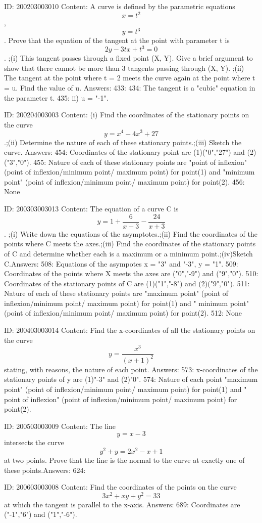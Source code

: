 \documentclass{article}
\begin{document}
ID: 200203003010
Content:
A curve is defined by the parametric equations  $$x = t^2 $$,  $$y = t^3 $$. Prove that the equation of the tangent at the point with parameter t is  $$2y - 3tx + t^3  = 0$$. ;(i) This tangent passes through a fixed point (X, Y). Give a brief argument to show that there cannot be more than 3 tangents passing through (X, Y). ;(ii) The tangent at the point where t = 2 meets the curve again at the point where t = u. Find the value of u. Answers:
433: 
434: The tangent is a "cubic" equation in the parameter t.
435: ii) u = "-1".

ID: 200204003003
Content:
(i) Find the coordinates of the stationary points on the curve  $$y = x^4  - 4x^3  + 27$$.;(ii) Determine the nature of each of these stationary points.;(iii) Sketch the curve. Answers:
454: Coordinates of the stationary point are (1)("0","27") and (2)("3","0").
455: Nature of each of these stationary points are "point of inflexion" (point of inflexion/minimum point/ maximum point) for point(1) and "minimum point" (point of inflexion/minimum point/ maximum point) for point(2).
456: None

ID: 200303003013
Content:
The equation of a curve C is \[y = 1 + \frac{6}{x - 3} - \frac{24}{x + 3}\]. ;(i) Write down the equations of the asymptotes.;(ii) Find the coordinates of the points where C meets the axes.;(iii) Find the coordinates of the stationary points of C and determine whether each is a maximum or a minimum point.;(iv)Sketch C.Answers:
508: Equations of the asympotes x = "3" and "-3", y = "1".
509: Coordinates of the points where X meets the axes are ("0","-9") and ("9","0").
510: Coordinates of the stationary points of C are (1)("1","-8") and (2)("9","0").
511: Nature of each of these stationary points are "maximum point" (point of inflexion/minimum point/ maximum point) for point(1) and " minimum point" (point of inflexion/minimum point/ maximum point) for point(2).
512: None

ID: 200403003014
Content:
Find the x-coordinates of all the stationary points on the curve  $$y = \frac{x^3}{(x + 1 )^2} $$ stating, with reasons, the nature of each point. Answers:
573: x-coordinates of the stationary points of y are (1)"-3" and (2)"0".
574: Nature of each point "maximum point" (point of inflexion/minimum point/ maximum point) for point(1) and " point of inflexion" (point of inflexion/minimum point/ maximum point) for point(2).

ID: 200503003009
Content:
The line $$y = x - 3$$ intersects the curve $$y^2 + y = 2 x^2 - x + 1$$  at two points. Prove that the line is the normal to the curve at exactly one of these points.Answers:
624: 

ID: 200603003008
Content:
Find the coordinates of the points on the curve $$3x^{2}+xy+y^{2}=33$$ at which the tangent is parallel to the x-axis. Answers:
689: Coordinates are ("-1","6") and ("1","-6").
\end{document}
